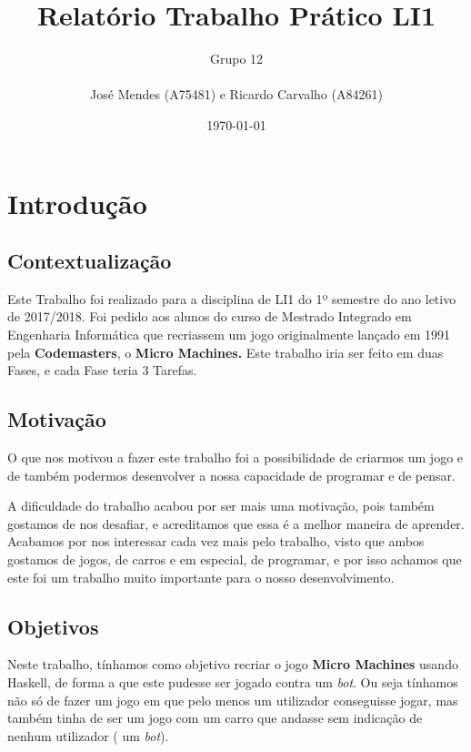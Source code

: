 \documentclass[a4paper]{report} %
\begin{document}
\title{Relatório Trabalho Prático LI1}

\author{Grupo 12\\
\\
José Mendes (A75481) e Ricardo Carvalho (A84261)}
\date{\today}

\maketitle

\tableofcontents

\listoffigures

\listoftables

\chapter{Introdução}

  \section{Contextualização}
  Este Trabalho foi realizado para a disciplina de LI1 do 1º semestre do ano letivo de 2017/2018.
  Foi pedido aos alunos do curso de Mestrado Integrado em Engenharia Informática que recriassem um jogo originalmente lançado em 1991 pela \textbf{Codemasters}, o  \textbf{Micro Machines.} Este trabalho iria ser feito em duas Fases, e cada Fase teria 3 Tarefas.
  
  \section{Motivação}
   O que nos motivou a fazer este trabalho foi a possibilidade de criarmos um jogo e de também podermos desenvolver a nossa capacidade de programar e de pensar. \par A dificuldade do trabalho acabou por ser mais uma motivação, pois também gostamos de nos desafiar, e acreditamos que essa é a melhor maneira de aprender.
   Acabamos por nos interessar cada vez mais pelo trabalho, visto que ambos gostamos de jogos, de carros e em especial, de programar, e por isso achamos que este foi um trabalho muito importante para o nosso desenvolvimento. 
   
  
  
  
  \section{Objetivos}
Neste trabalho, tínhamos como objetivo recriar o jogo \textbf{Micro Machines} usando Haskell,  de forma a que este pudesse ser jogado contra um \textit{bot}. Ou seja tínhamos não só de fazer um jogo em que pelo menos um utilizador conseguisse jogar, mas também tinha de ser um jogo com um carro que andasse sem indicação de nenhum utilizador ( um \textit{bot}).
\end{document}
